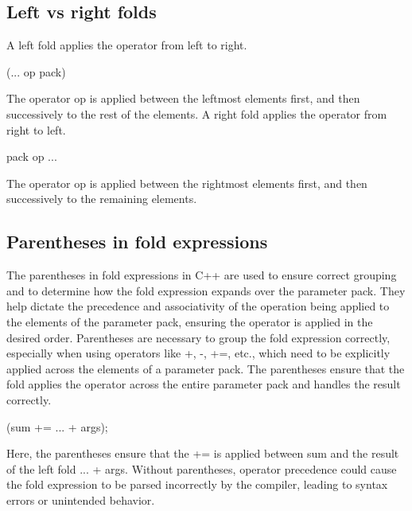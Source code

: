 \documentclass{report}
\begin{document}
     \pagebreak \bigbreak \noindent 
     \subsection{Left vs right folds}
     \bigbreak \noindent 
     A left fold applies the operator from left to right.
     \bigbreak \noindent 
     \begin{cppcode}
         (... op pack)
     \end{cppcode}
     \bigbreak \noindent 
     The operator op is applied between the leftmost elements first, and then successively to the rest of the elements.
     \bigbreak \noindent 
     A right fold applies the operator from right to left.
     \bigbreak \noindent 
     \begin{cppcode}
     pack op ...
     \end{cppcode}
     \bigbreak \noindent 
     The operator op is applied between the rightmost elements first, and then successively to the remaining elements.

     \pagebreak \bigbreak \noindent 
     \subsection{Parentheses in fold expressions}
     \bigbreak \noindent 
     The parentheses in fold expressions in C++ are used to ensure correct grouping and to determine how the fold expression expands over the parameter pack. They help dictate the precedence and associativity of the operation being applied to the elements of the parameter pack, ensuring the operator is applied in the desired order.
     \bigbreak \noindent 
     Parentheses are necessary to group the fold expression correctly, especially when using operators like +, -, +=, etc., which need to be explicitly applied across the elements of a parameter pack.
     \bigbreak \noindent 
     The parentheses ensure that the fold applies the operator across the entire parameter pack and handles the result correctly.
     \bigbreak \noindent 
     \begin{cppcode}
     (sum += ... + args);
     \end{cppcode}
     \bigbreak \noindent 
     Here, the parentheses ensure that the += is applied between sum and the result of the left fold ... + args.
     \bigbreak \noindent 
     Without parentheses, operator precedence could cause the fold expression to be parsed incorrectly by the compiler, leading to syntax errors or unintended behavior.
\end{document}
